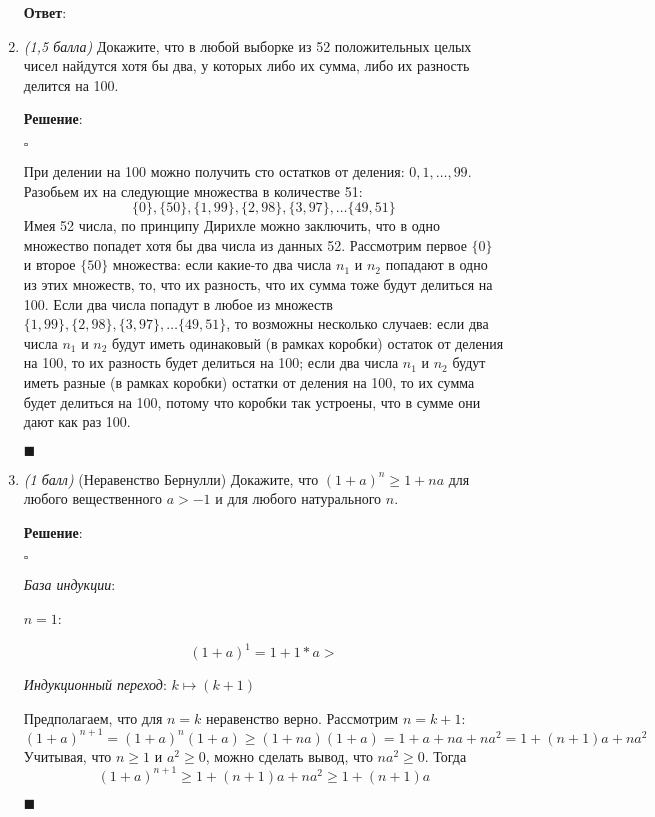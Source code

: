 \documentclass{article}
\begin{document}
\begin{enumerate}
        \textbf{Ответ}:

        \item \textit{(1,5 балла)} Докажите, что в любой выборке из 52 положительных целых чисел найдутся хотя бы два, у которых либо их сумма, либо их разность делится на 100.
        
        \textbf{Решение}:

        $\square$

        При делении на 100 можно получить сто остатков от деления: $0, 1, \ldots, 99$. Разобьем их на следующие множества в количестве 51:
        $$\{0\}, \{50\}, \{1, 99\}, \{2, 98\}, \{3, 97\}, \ldots \{49, 51\}$$
        Имея 52 числа, по принципу Дирихле можно заключить, что в одно множество попадет хотя бы два числа из данных 52. Рассмотрим первое $\{0\}$ и второе $\{50\}$ множества: если какие-то два числа $n_1$ и $n_2$ попадают в одно из этих множеств, то, что их разность, что их сумма тоже будут делиться на 100. Если два числа попадут в любое из множеств $\{1, 99\}, \{2, 98\}, \{3, 97\}, \ldots \{49, 51\}$, то возможны несколько случаев: если два числа $n_1$ и $n_2$ будут иметь одинаковый (в рамках коробки) остаток от деления на 100, то их разность будет делиться на 100; если два числа $n_1$ и $n_2$ будут иметь разные (в рамках коробки) остатки от деления на 100, то их сумма будет делиться на 100, потому что коробки так устроены, что в сумме они дают как раз 100.
        \begin{flushright}
            $\blacksquare$
        \end{flushright}

        \item \textit{(1 балл)} (Неравенство Бернулли) Докажите, что $(1+a)^n\geq1+na$ для любого вещественного $a>-1$ и для любого натурального $n$.
        
        \textbf{Решение}:

        $\square$

        \textit{База индукции}:
        
        $n=1$: 

        $$(1+a)^1=1+1*a>$$

        \textit{Индукционный переход}: $k\mapsto(k+1)$

        Предполагаем, что для $n=k$ неравенство верно. Рассмотрим $n=k+1$:
        $$(1+a)^{n+1}=(1+a)^n(1+a)\geq(1+na)(1+a)=1+a+na+na^2=1+(n+1)a+na^2$$
        Учитывая, что $n\geq1$ и $a^2\geq0$, можно сделать вывод, что $na^2\geq0$. Тогда
        $$(1+a)^{n+1}\geq1+(n+1)a+na^2\geq1+(n+1)a$$

        \begin{flushright}
            $\blacksquare$
        \end{flushright}

    \end{enumerate}
\end{document}
